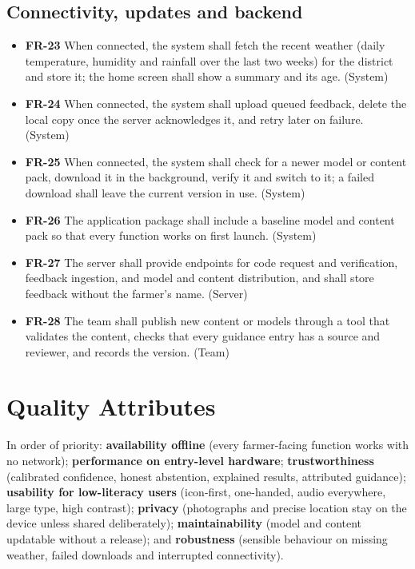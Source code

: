 \subsection{Connectivity, updates and backend}
\begin{itemize}
  \item \textbf{FR-23} When connected, the system shall fetch the recent weather (daily temperature, humidity and rainfall over the last two weeks) for the district and store it; the home screen shall show a summary and its age. (System)
  \item \textbf{FR-24} When connected, the system shall upload queued feedback, delete the local copy once the server acknowledges it, and retry later on failure. (System)
  \item \textbf{FR-25} When connected, the system shall check for a newer model or content pack, download it in the background, verify it and switch to it; a failed download shall leave the current version in use. (System)
  \item \textbf{FR-26} The application package shall include a baseline model and content pack so that every function works on first launch. (System)
  \item \textbf{FR-27} The server shall provide endpoints for code request and verification, feedback ingestion, and model and content distribution, and shall store feedback without the farmer's name. (Server)
  \item \textbf{FR-28} The team shall publish new content or models through a tool that validates the content, checks that every guidance entry has a source and reviewer, and records the version. (Team)
\end{itemize}

\section{Quality Attributes}
\label{sec:qa}
In order of priority: \textbf{availability offline} (every farmer-facing function works with no network); \textbf{performance on entry-level hardware}; \textbf{trustworthiness} (calibrated confidence, honest abstention, explained results, attributed guidance); \textbf{usability for low-literacy users} (icon-first, one-handed, audio everywhere, large type, high contrast); \textbf{privacy} (photographs and precise location stay on the device unless shared deliberately); \textbf{maintainability} (model and content updatable without a release); and \textbf{robustness} (sensible behaviour on missing weather, failed downloads and interrupted connectivity).

